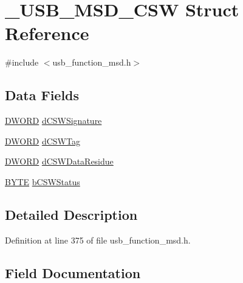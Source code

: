 \hypertarget{struct___u_s_b___m_s_d___c_s_w}{}\section{\+\_\+\+U\+S\+B\+\_\+\+M\+S\+D\+\_\+\+C\+S\+W Struct Reference}
\label{struct___u_s_b___m_s_d___c_s_w}


{\ttfamily \#include $<$usb\+\_\+function\+\_\+msd.\+h$>$}

\subsection*{Data Fields}
\begin{DoxyCompactItemize}
\item 
\hyperlink{_generic_type_defs_8h_ad342ac907eb044443153a22f964bf0af}{D\+W\+O\+R\+D} \hyperlink{struct___u_s_b___m_s_d___c_s_w_a8cb10ba77f1e242bb97716c74eca0996}{d\+C\+S\+W\+Signature}
\item 
\hyperlink{_generic_type_defs_8h_ad342ac907eb044443153a22f964bf0af}{D\+W\+O\+R\+D} \hyperlink{struct___u_s_b___m_s_d___c_s_w_ae11dc5d087f1ed22df588b55ff44fc6e}{d\+C\+S\+W\+Tag}
\item 
\hyperlink{_generic_type_defs_8h_ad342ac907eb044443153a22f964bf0af}{D\+W\+O\+R\+D} \hyperlink{struct___u_s_b___m_s_d___c_s_w_a75a0a98b1067abe2fdbd5b83e7c51bd8}{d\+C\+S\+W\+Data\+Residue}
\item 
\hyperlink{_generic_type_defs_8h_a4ae1dab0fb4b072a66584546209e7d58}{B\+Y\+T\+E} \hyperlink{struct___u_s_b___m_s_d___c_s_w_a2edede2ae4b6f4189a1a4a6576c6524e}{b\+C\+S\+W\+Status}
\end{DoxyCompactItemize}


\subsection{Detailed Description}


Definition at line 375 of file usb\+\_\+function\+\_\+msd.\+h.



\subsection{Field Documentation}
\hypertarget{struct___u_s_b___m_s_d___c_s_w_a2edede2ae4b6f4189a1a4a6576c6524e}{}
